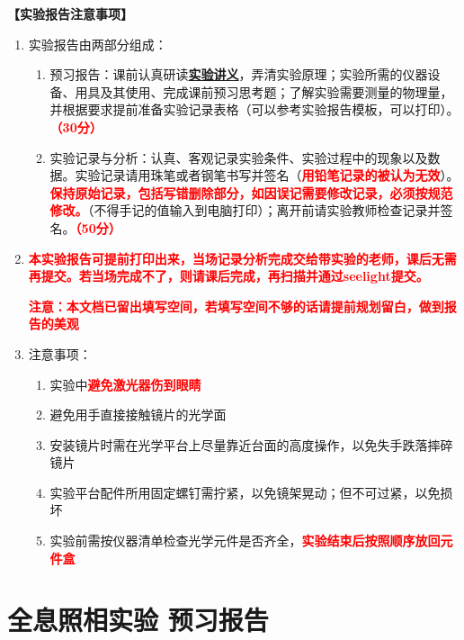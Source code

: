 \documentclass[dvipsnames, svgnames,a4paper,11pt]{article}
\begin{document}
\textbf{【实验报告注意事项】}
\begin{enumerate}[label=\arabic*., leftmargin=*]
	\item 实验报告由两部分组成：
		\begin{enumerate}[label=\arabic*), leftmargin=*]
			\item 预习报告：课前认真研读\underline{\textbf{实验讲义}}，弄清实验原理；实验所需的仪器设备、用具及其使用、完成课前预习思考题；了解实验需要测量的物理量，并根据要求提前准备实验记录表格（可以参考实验报告模板，可以打印）。\textcolor{red}{\textbf{（30分）}}
			\item 实验记录与分析：认真、客观记录实验条件、实验过程中的现象以及数据。实验记录请用珠笔或者钢笔书写并签名（\textcolor{red}{\textbf{用铅笔记录的被认为无效}}）。\textcolor{red}{\textbf{保持原始记录，包括写错删除部分，如因误记需要修改记录，必须按规范修改。}}（不得手记的值输入到电脑打印）；离开前请实验教师检查记录并签名。\textcolor{red}{\textbf{（50分）}}
		\end{enumerate}
	
	\item \textcolor{red}{\textbf{本实验报告可提前打印出来，当场记录分析完成交给带实验的老师，课后无需再提交。若当场完成不了，则请课后完成，再扫描并通过seelight提交。}}
	
	\textcolor{red}{\textbf{注意：本文档已留出填写空间，若填写空间不够的话请提前规划留白，做到报告的美观}}
	\item 注意事项：
		\begin{enumerate}[label=\arabic*), leftmargin=*]
			\item 实验中\textcolor{red}{\textbf{避免激光器伤到眼睛}}
			\item 避免用手直接接触镜片的光学面
			\item 安装镜片时需在光学平台上尽量靠近台面的高度操作，以免失手跌落摔碎镜片
			\item 实验平台配件所用固定螺钉需拧紧，以免镜架晃动；但不可过紧，以免损坏
			\item 实验前需按仪器清单检查光学元件是否齐全，\textcolor{red}{\textbf{实验结束后按照顺序放回元件盒}}
			
		\end{enumerate}
\end{enumerate}


\clearpage
\tableofcontents
\clearpage

\setcounter{section}{0}
\section{全息照相实验 \quad\heiti 预习报告}
	
\end{document}
